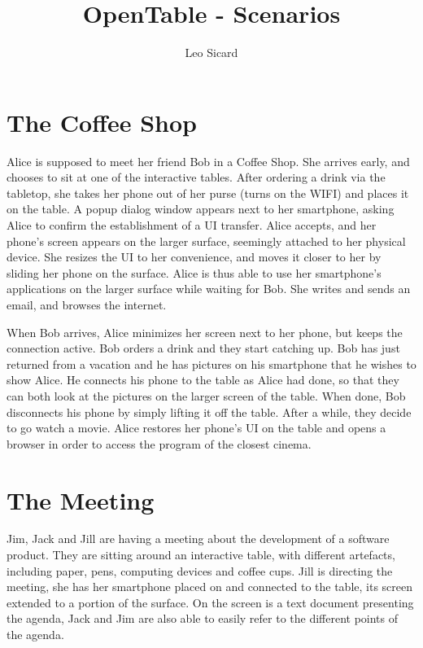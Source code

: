 \documentclass[11pt]{amsart}
\title{OpenTable - Scenarios}
\author{Leo Sicard}
\begin{document}
\maketitle

\section{The Coffee Shop}

Alice is supposed to meet her friend Bob in a Coffee Shop.
She arrives early, and chooses to sit at one of the interactive tables.
After ordering a drink via the tabletop, she takes her phone out of her purse (turns on the WIFI) and places it on the table.
A popup dialog window appears next to her smartphone, asking Alice to confirm the establishment of a UI transfer.
Alice accepts, and her phone's screen appears on the larger surface, seemingly attached to her physical device.
She resizes the UI to her convenience, and moves it closer to her by sliding her phone on the surface.
Alice is thus able to use her smartphone's applications on the larger surface while waiting for Bob. She writes and sends an email, and browses the internet.

When Bob arrives, Alice minimizes her screen next to her phone, but keeps the connection active.
Bob orders a drink and they start catching up.
Bob has just returned from a vacation and he has pictures on his smartphone that he wishes to show Alice.
He connects his phone to the table as Alice had done, so that they can both look at the pictures on the larger screen of the table. When done, Bob disconnects his phone by simply lifting it off the table.
After a while, they decide to go watch a movie.
Alice restores her phone's UI on the table and opens a browser in order to access the program of the closest cinema.

\section{The Meeting}

Jim, Jack and Jill are having a meeting about the development of a software product.
They are sitting around an interactive table, with different artefacts, including paper, pens, computing devices and coffee cups.
Jill is directing the meeting, she has her smartphone placed on and connected to the table, its screen extended to a portion of the surface.
On the screen is a text document presenting the agenda, Jack and Jim are also able to easily refer to the different points of the agenda.
\end{document}
